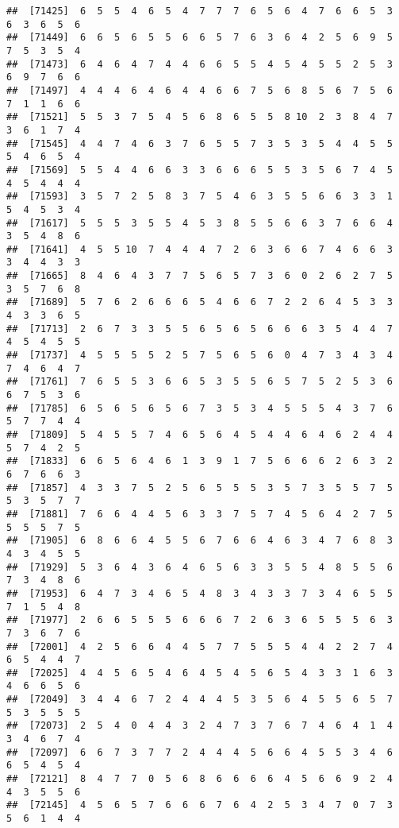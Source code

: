 \documentclass[
]{book}
\begin{document}
\begin{verbatim}
##  [71425]  6  5  5  4  6  5  4  7  7  7  6  5  6  4  7  6  6  5  3  6  3  6  5  6
##  [71449]  6  6  5  6  5  5  6  6  5  7  6  3  6  4  2  5  6  9  5  7  5  3  5  4
##  [71473]  6  4  6  4  7  4  4  6  6  5  5  4  5  4  5  5  2  5  3  6  9  7  6  6
##  [71497]  4  4  4  6  4  6  4  4  6  6  7  5  6  8  5  6  7  5  6  7  1  1  6  6
##  [71521]  5  5  3  7  5  4  5  6  8  6  5  5  8 10  2  3  8  4  7  3  6  1  7  4
##  [71545]  4  4  7  4  6  3  7  6  5  5  7  3  5  3  5  4  4  5  5  5  4  6  5  4
##  [71569]  5  5  4  4  6  6  3  3  6  6  6  5  5  3  5  6  7  4  5  4  5  4  4  4
##  [71593]  3  5  7  2  5  8  3  7  5  4  6  3  5  5  6  6  3  3  1  5  4  5  3  4
##  [71617]  5  5  5  3  5  5  4  5  3  8  5  5  6  6  3  7  6  6  4  3  5  4  8  6
##  [71641]  4  5  5 10  7  4  4  4  7  2  6  3  6  6  7  4  6  6  3  3  4  4  3  3
##  [71665]  8  4  6  4  3  7  7  5  6  5  7  3  6  0  2  6  2  7  5  3  5  7  6  8
##  [71689]  5  7  6  2  6  6  6  5  4  6  6  7  2  2  6  4  5  3  3  4  3  3  6  5
##  [71713]  2  6  7  3  3  5  5  6  5  6  5  6  6  6  3  5  4  4  7  4  5  4  5  5
##  [71737]  4  5  5  5  5  2  5  7  5  6  5  6  0  4  7  3  4  3  4  7  4  6  4  7
##  [71761]  7  6  5  5  3  6  6  5  3  5  5  6  5  7  5  2  5  3  6  6  7  5  3  6
##  [71785]  6  5  6  5  6  5  6  7  3  5  3  4  5  5  5  4  3  7  6  5  7  7  4  4
##  [71809]  5  4  5  5  7  4  6  5  6  4  5  4  4  6  4  6  2  4  4  5  7  4  2  5
##  [71833]  6  6  5  6  4  6  1  3  9  1  7  5  6  6  6  2  6  3  2  6  7  6  6  3
##  [71857]  4  3  3  7  5  2  5  6  5  5  5  3  5  7  3  5  5  7  5  5  3  5  7  7
##  [71881]  7  6  6  4  4  5  6  3  3  7  5  7  4  5  6  4  2  7  5  5  5  5  7  5
##  [71905]  6  8  6  6  4  5  5  6  7  6  6  4  6  3  4  7  6  8  3  4  3  4  5  5
##  [71929]  5  3  6  4  3  6  4  6  5  6  3  3  5  5  4  8  5  5  6  7  3  4  8  6
##  [71953]  6  4  7  3  4  6  5  4  8  3  4  3  3  7  3  4  6  5  5  7  1  5  4  8
##  [71977]  2  6  6  5  5  5  6  6  6  7  2  6  3  6  5  5  5  6  3  7  3  6  7  6
##  [72001]  4  2  5  6  6  4  4  5  7  7  5  5  5  4  4  2  2  7  4  6  5  4  4  7
##  [72025]  4  4  5  6  5  4  6  4  5  4  5  6  5  4  3  3  1  6  3  4  6  6  5  6
##  [72049]  3  4  4  6  7  2  4  4  4  5  3  5  6  4  5  5  6  5  7  5  3  5  5  5
##  [72073]  2  5  4  0  4  4  3  2  4  7  3  7  6  7  4  6  4  1  4  3  4  6  7  4
##  [72097]  6  6  7  3  7  7  2  4  4  4  5  6  6  4  5  5  3  4  6  6  5  4  5  4
##  [72121]  8  4  7  7  0  5  6  8  6  6  6  6  4  5  6  6  9  2  4  4  3  5  5  6
##  [72145]  4  5  6  5  7  6  6  6  7  6  4  2  5  3  4  7  0  7  3  5  6  1  4  4

\end{verbatim}
\end{document}
